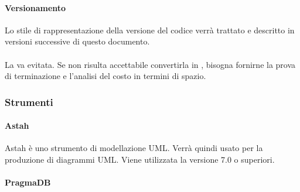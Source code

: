  \paragraph{Versionamento}
 Lo stile di rappresentazione della versione del codice verrà trattato e descritto in versioni successive di questo documento.
 \paragraph{}
 La  va evitata. Se non risulta accettabile convertirla in , bisogna fornirne la prova di terminazione e l'analisi del costo in termini di spazio.
\subsubsection{Strumenti}
  \paragraph{Astah}
  Astah è uno strumento di modellazione UML. Verrà quindi usato per la produzione di diagrammi UML. Viene utilizzata la versione 7.0 o superiori.
 \paragraph{PragmaDB}



  
